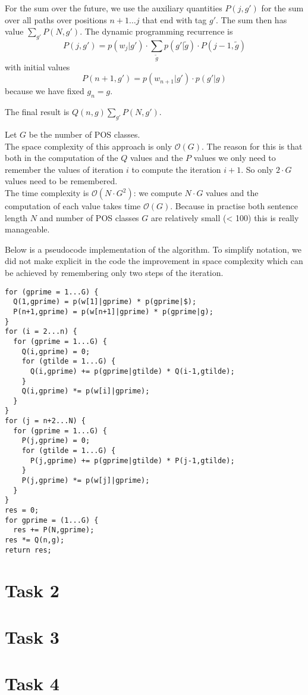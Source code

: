 \documentclass[%
   11pt,              %
   ngerman,           %
   a4paper,           %
   DIV11,             %
]{scrartcl}%
\begin{document}
For the sum over the future, we use the auxiliary quantities $P(j,g')$ for the sum over all paths over positions $n+1\ldots j$ that end with tag $g'$. The sum then has value $\sum_{g'} P(N,g')$. The dynamic programming recurrence is
\begin{equation*}
	P(j,g') = p(w_j|g') \cdot \sum_{\tilde{g}} p(g'|\tilde{g}) \cdot P(j-1,\tilde{g}) 
\end{equation*}
with initial values
\begin{equation*}
	P(n+1,g') = p(w_{n+1}|g') \cdot p(g'|g)
\end{equation*}
because we have fixed $g_n = g$. \par
The final result is $Q(n,g) \sum_{g'} P(N,g')$. \par
Let $G$ be the number of POS classes. \\ The space complexity of this approach is only $\mathcal{O}(G)$. The reason for this is that both in the computation of the $Q$ values and the $P$ values we only need to remember the values of iteration $i$ to compute the iteration $i+1$. So only $2 \cdot G$ values need to be remembered.\\
The time complexity is $\mathcal{O}(N \cdot G^2)$: we compute $N \cdot G$ values and the computation of each value takes time $\mathcal{O}(G)$. Because in practise both sentence length $N$ and number of POS classes $G$ are relatively small (< 100) this is really manageable. \par
Below is a pseudocode implementation of the algorithm. To simplify notation, we did not make explicit in the code the improvement in space complexity which can be achieved by remembering only two steps of the iteration.
\lstset{language=C, showstringspaces=false}
\begin{lstlisting}
for (gprime = 1...G) {
  Q(1,gprime) = p(w[1]|gprime) * p(gprime|$);
  P(n+1,gprime) = p(w[n+1]|gprime) * p(gprime|g);
}
for (i = 2...n) {
  for (gprime = 1...G) {
    Q(i,gprime) = 0;
	for (gtilde = 1...G) {
	  Q(i,gprime) += p(gprime|gtilde) * Q(i-1,gtilde);
	}
    Q(i,gprime) *= p(w[i]|gprime);
  }
}
for (j = n+2...N) {
  for (gprime = 1...G) {
	P(j,gprime) = 0;
	for (gtilde = 1...G) {
	  P(j,gprime) += p(gprime|gtilde) * P(j-1,gtilde);
	}
	P(j,gprime) *= p(w[j]|gprime);
  }
}
res = 0;
for gprime = (1...G) {
  res += P(N,gprime);
res *= Q(n,g);
return res;
\end{lstlisting}
\section*{Task 2}
\section*{Task 3}
\section*{Task 4}
\end{document}
